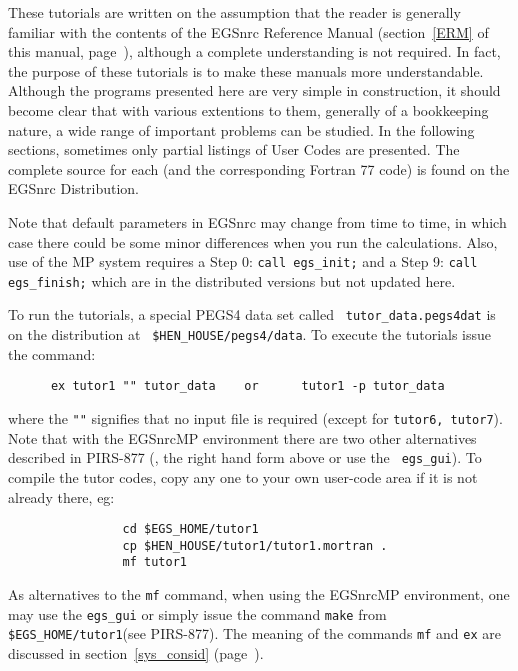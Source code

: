 These tutorials are written on the assumption that the reader is
generally familiar with the contents of the EGSnrc Reference Manual
(section~\ref{ERM} of this manual, page~\pageref{ERM}), although a
complete understanding is not required.  In fact, the purpose
of these tutorials is to make these manuals more understandable.
Although the programs presented here are very simple in construction,
it should become clear that with various extentions to them, generally
of a bookkeeping nature, a wide range of important problems can be
studied.  In the following sections, sometimes only partial listings of
User Codes are presented.  The complete source for each (and the
corresponding Fortran 77 code) is found on the EGSnrc Distribution.

Note that default parameters in EGSnrc may change from time to time, in which
case there could be some minor differences when you run the calculations. Also,
use of the MP system requires a Step 0: {\tt call egs\_init;} and a Step 9:
{\tt call egs\_finish;} which are in the distributed versions but not updated
here. 


To run the tutorials, a special PEGS4 data set called {\tt
tutor\_data.pegs4dat} is on the distribution at {\tt
\$HEN\_HOUSE/pegs4/data}.  To execute the tutorials issue the
command:
\begin{verbatim}
      ex tutor1 "" tutor_data    or      tutor1 -p tutor_data
\end{verbatim}
where the {\tt ""} signifies that no input file is required (except for
{\tt tutor6, tutor7}). Note that with the EGSnrcMP environment
there are two other alternatives described
in PIRS-877\cite{Ka03} (\viz, the right hand form above or use the {\tt
egs\_gui}).  To compile the tutor codes, copy any one to your
own user-code area if it is not already there, eg:
\vspace*{-3mm}
\begin{verbatim}
                cd $EGS_HOME/tutor1
                cp $HEN_HOUSE/tutor1/tutor1.mortran .
                mf tutor1
\end{verbatim}
\vspace*{-3mm}
As alternatives to the {\tt mf} command, when using the EGSnrcMP
environment, one may use the {\tt egs\_gui} or simply issue the command
{\tt make} from {\tt \$EGS\_HOME/tutor1}(see PIRS-877\cite{Ka03}).
The meaning of the commands {\tt mf} and {\tt ex} are discussed in
section~\ref{sys_consid} (page~\pageref{sys_consid}).

